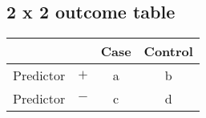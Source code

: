 \documentclass[a4paper]{article}
\begin{document}
\begin{center}
\section*{2 x 2 outcome table}
\end{center}

\begin{center}
\begin{tabular}{l c | c | c}
\toprule
& & Case & Control \\ 
\hline
Predictor & $+$ & a & b \\
\hline
Predictor & $-$ & c & d \\
\bottomrule
\end{tabular}

\end{center}



\end{document}
